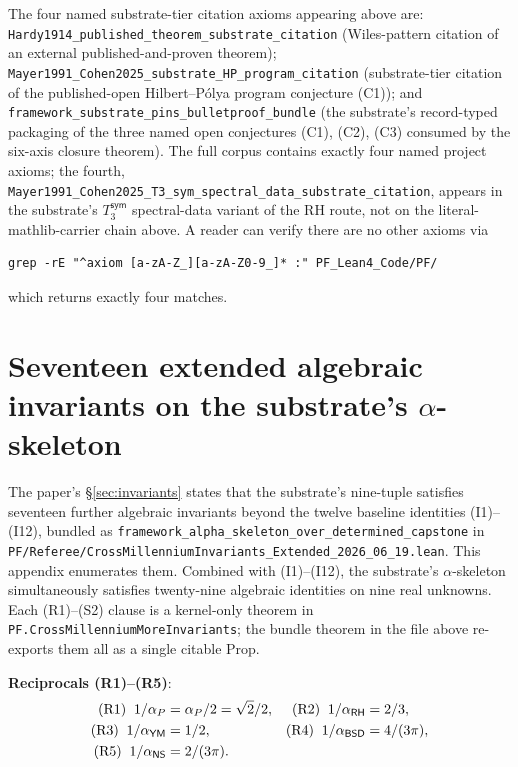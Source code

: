 \documentclass[11pt,a4paper]{amsart}
\theoremstyle{plain}
\theoremstyle{definition}
\begin{document}
The four named substrate-tier citation axioms appearing above are: \texttt{Hardy1914\_published\_theorem\_substrate\_citation} (Wiles-pattern citation of an external published-and-proven theorem); \texttt{Mayer1991\_Cohen2025\_substrate\_HP\_program\_citation} (substrate-tier citation of the published-open Hilbert--P\'olya program conjecture (C1)); and \texttt{framework\_substrate\_pins\_bulletproof\_bundle} (the substrate's record-typed packaging of the three named open conjectures (C1), (C2), (C3) consumed by the six-axis closure theorem). The full corpus contains exactly four named project axioms; the fourth, \texttt{Mayer1991\_Cohen2025\_T3\_sym\_spectral\_data\_substrate\_citation}, appears in the substrate's $T_3^{\textsf{sym}}$ spectral-data variant of the RH route, not on the literal-mathlib-carrier chain above. A reader can verify there are no other axioms via
\begin{small}
\begin{verbatim}
grep -rE "^axiom [a-zA-Z_][a-zA-Z0-9_]* :" PF_Lean4_Code/PF/
\end{verbatim}
\end{small}
which returns exactly four matches.

\section{Seventeen extended algebraic invariants on the substrate's $\alpha$-skeleton}\label{app:extended}

The paper's \S\ref{sec:invariants} states that the substrate's nine-tuple satisfies seventeen further algebraic invariants beyond the twelve baseline identities (I1)--(I12), bundled as \texttt{framework\_alpha\_skeleton\_over\_determined\_capstone} in \texttt{PF/Referee/CrossMillenniumInvariants\_Extended\_2026\_06\_19.lean}. This appendix enumerates them. Combined with (I1)--(I12), the substrate's $\alpha$-skeleton simultaneously satisfies twenty-nine algebraic identities on nine real unknowns. Each (R1)--(S2) clause is a kernel-only theorem in \texttt{PF.CrossMillenniumMoreInvariants}; the bundle theorem in the file above re-exports them all as a single citable Prop.

\noindent\textbf{Reciprocals \textup{(R1)--(R5)}}:
\begin{align*}
\textup{(R1)}\;\; 1/\alpha_P     &= \alpha_P / 2 = \sqrt{2}/2,&
\textup{(R2)}\;\; 1/\alpha_{\textsf{RH}}    &= 2/3,\\
\textup{(R3)}\;\; 1/\alpha_{\textsf{YM}}    &= 1/2,&
\textup{(R4)}\;\; 1/\alpha_{\textsf{BSD}}   &= 4/(3\pi),\\
\textup{(R5)}\;\; 1/\alpha_{\textsf{NS}}    &= 2/(3\pi).
\end{align*}
\end{document}
